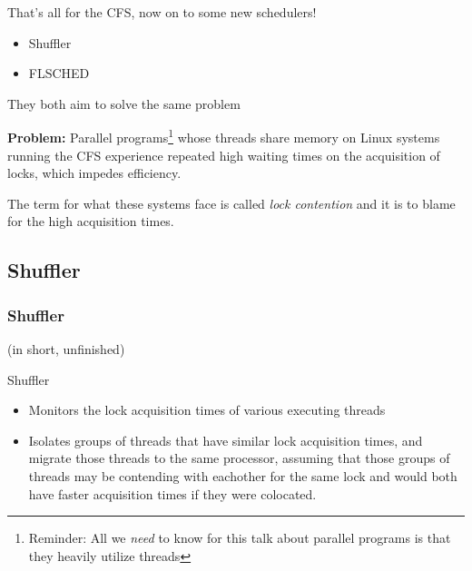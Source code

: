 \documentclass{beamer}
\newcommand{\linespace}{\vskip 0.25cm}
\begin{document}
\begin{frame}
That's all for the CFS, now on to some new schedulers!

\linespace

\begin{itemize}
\item Shuffler
\item FLSCHED
\end{itemize}

\linespace

They both aim to solve the same problem

\linespace
\textbf{Problem:} Parallel programs\footnote{Reminder: All we \emph{need} to know for this talk about parallel programs is that they heavily utilize threads} whose threads share memory on Linux systems running the CFS experience repeated high waiting times on the acquisition of locks, which impedes efficiency.

\linespace

\linespace

The term for what these systems face is called \emph{lock contention} and it is to blame for the high acquisition times.
\end{frame}

\subsection{Shuffler}
\begin{frame}
\frametitle{Shuffler}

(in short, unfinished)

Shuffler
\begin{itemize}

\item Monitors the lock acquisition times of various executing threads
\item Isolates groups of threads that have similar lock acquisition times, and migrate those threads to the same processor, assuming that those groups of threads may be contending with eachother for the same lock and would both have faster acquisition times if they were colocated.
\end{itemize}

\end{frame}
\end{document}
